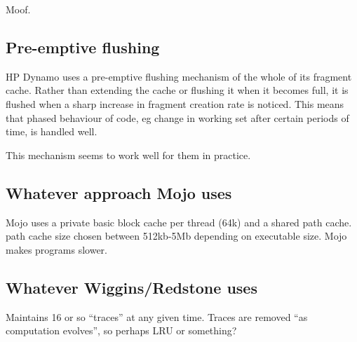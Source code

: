 Moof.

\subsection{Pre-emptive flushing}

HP Dynamo uses a pre-emptive flushing mechanism of the whole of its fragment cache. Rather than extending the cache or flushing it when it becomes full, it is flushed when a sharp increase in fragment creation rate is noticed. This means that phased behaviour of code, eg change in working set after certain periods of time, is handled well.

This mechanism seems to work well for them in practice.

\subsection{Whatever approach Mojo uses}

Mojo uses a private basic block cache per thread (64k) and a shared path cache. path cache size chosen between 512kb-5Mb depending on executable size. Mojo makes programs slower.

\subsection{Whatever Wiggins/Redstone uses}

Maintains 16 or so ``traces'' at any given time. Traces are removed ``as computation evolves'', so perhaps LRU or something?
